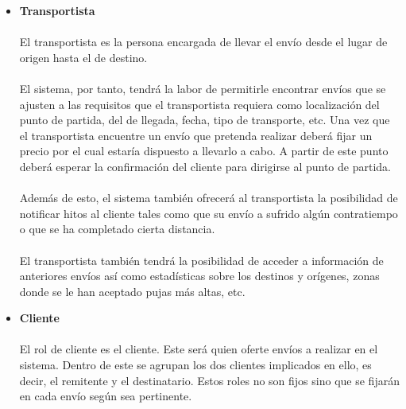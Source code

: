 \documentclass[10pt, a4paper,spanish]{article}
\begin{document}
			\begin{itemize}


				\item{\textbf{Transportista}}

				\paragraph{}
				El transportista es la persona encargada de llevar el envío desde el lugar de origen hasta el de destino.

				\paragraph{}
				El sistema, por tanto, tendrá la labor de permitirle encontrar envíos que se ajusten a las requisitos que el transportista requiera como localización del punto de partida, del de llegada, fecha, tipo de transporte, etc. Una vez que el transportista encuentre un envío que pretenda realizar deberá fijar un precio por el cual estaría dispuesto a llevarlo a cabo. A partir de este punto deberá esperar la confirmación del cliente para dirigirse al punto de partida.

				\paragraph{}
				Además de esto, el sistema también ofrecerá al transportista la posibilidad de notificar hitos al cliente tales como que su envío a sufrido algún contratiempo o que se ha completado cierta distancia.

				\paragraph{}
				El transportista también tendrá la posibilidad de acceder a información de anteriores envíos así como estadísticas sobre los destinos y orígenes, zonas donde se le han aceptado pujas más altas, etc.


				\item{\textbf{Cliente}}
				\paragraph{}
				El rol de cliente es el cliente. Este será quien oferte envíos a realizar en el sistema. Dentro de este se agrupan los dos clientes implicados en ello, es decir, el remitente y el destinatario. Estos roles no son fijos sino que se fijarán en cada envío según sea pertinente.


\end{itemize}
\end{document}
